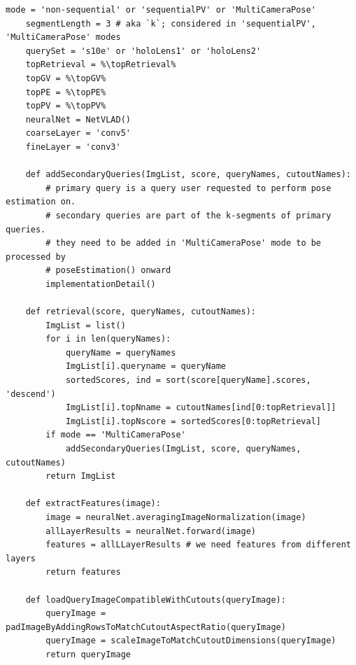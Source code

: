 \documentclass[twoside]{ctuthesis}
\theoremstyle{plain}
\theoremstyle{definition}
\theoremstyle{note}
\newcommand{\todo}[1][]{%
\ifthenelse{\isempty{#1}}{\textbf{TODO}}{\textbf{TODO: #1}}%
}
\newcommand{\topRetrieval}{100} %
\newcommand{\topGV}{10} %
\newcommand{\topPE}{10} %
\newcommand{\topPV}{1} %
\begin{document}
\renewcommand{\lstlistingname}{Algorithm} %
\renewcommand{\lstlistlistingname}{List of \lstlistingname s} %

\begin{lstlisting}[style=pseudocode, caption={InLocCIIRC pseudocode. \todo[pseudocode review.]}]
	mode = 'non-sequential' or 'sequentialPV' or 'MultiCameraPose'
	segmentLength = 3 # aka `k`; considered in 'sequentialPV', 'MultiCameraPose' modes
	querySet = 's10e' or 'holoLens1' or 'holoLens2'
	topRetrieval = %\topRetrieval%
	topGV = %\topGV%
	topPE = %\topPE%
	topPV = %\topPV%
	neuralNet = NetVLAD()
	coarseLayer = 'conv5'
	fineLayer = 'conv3'

	def addSecondaryQueries(ImgList, score, queryNames, cutoutNames):
		# primary query is a query user requested to perform pose estimation on.
		# secondary queries are part of the k-segments of primary queries.
		# they need to be added in 'MultiCameraPose' mode to be processed by
		# poseEstimation() onward
		implementationDetail()

	def retrieval(score, queryNames, cutoutNames):
		ImgList = list()
		for i in len(queryNames):
			queryName = queryNames
			ImgList[i].queryname = queryName
			sortedScores, ind = sort(score[queryName].scores, 'descend')
			ImgList[i].topNname = cutoutNames[ind[0:topRetrieval]]
			ImgList[i].topNscore = sortedScores[0:topRetrieval]
		if mode == 'MultiCameraPose'
			addSecondaryQueries(ImgList, score, queryNames, cutoutNames)
		return ImgList

	def extractFeatures(image):
		image = neuralNet.averagingImageNormalization(image)
		allLayerResults = neuralNet.forward(image)
		features = allLLayerResults # we need features from different layers
		return features

	def loadQueryImageCompatibleWithCutouts(queryImage):
		queryImage = padImageByAddingRowsToMatchCutoutAspectRatio(queryImage)
		queryImage = scaleImageToMatchCutoutDimensions(queryImage)
		return queryImage


\end{lstlisting}
\end{document}
